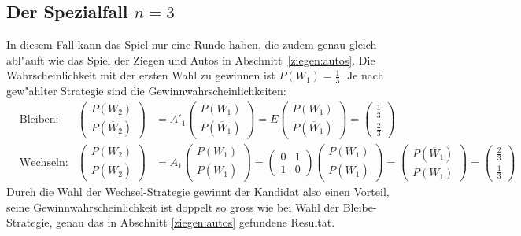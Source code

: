 \subsection{Der Spezialfall $n=3$}
In diesem Fall kann das Spiel nur eine Runde haben, die zudem genau gleich
abl"auft wie das Spiel der Ziegen und Autos in Abschnitt~\ref{ziegen:autos}.
Die Wahrscheinlichkeit mit der ersten Wahl zu gewinnen ist $P(W_1)=\frac13$.
Je nach gew"ahlter Strategie sind die Gewinnwahrscheinlichkeiten:
\begin{align*}
&\text{Bleiben:}&
\begin{pmatrix}P(W_2)\\P(\overline{W}_2)\end{pmatrix}
&=A'_1\begin{pmatrix}P(W_1)\\P(\overline{W}_1)\end{pmatrix}
=E\begin{pmatrix}P(W_1)\\P(\overline{W}_1)\end{pmatrix}
=\begin{pmatrix}\frac13\\\frac23\end{pmatrix}
\\
&\text{Wechseln:}&
\begin{pmatrix}P(W_2)\\P(\overline{W}_2)\end{pmatrix}
&=A_1\begin{pmatrix}P(W_1)\\P(\overline{W}_1)\end{pmatrix}
=\begin{pmatrix}0&1\\1&0\end{pmatrix}\begin{pmatrix}P(W_1)\\P(\overline{W}_1)\end{pmatrix}
=\begin{pmatrix}P(\overline{W}_1)\\P(W_1)\end{pmatrix}
=\begin{pmatrix}\frac23\\\frac13\end{pmatrix}
\end{align*}
Durch die Wahl der Wechsel-Strategie gewinnt der Kandidat also einen Vorteil,
seine Gewinnwahrscheinlichkeit ist doppelt so gross wie bei Wahl der
Bleibe-Strategie, genau das in Abschnitt \ref{ziegen:autos} gefundene
Resultat.

